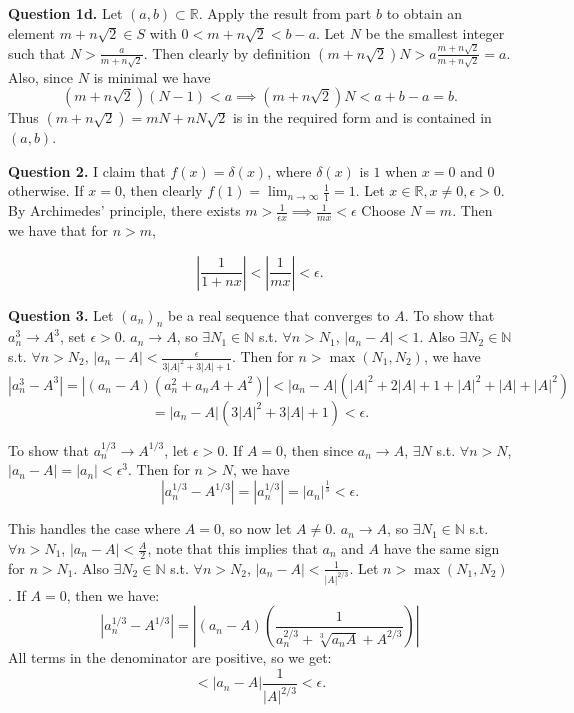 \documentclass[letterpaper, reqno,11pt]{article}
\begin{document}
{\medskip\noindent\bf Question 1d.} Let $(a,b)\subset \mathbb{R}$. Apply the result from part $b$ to obtain an element $m+n\sqrt{2}\in S$ with $0<m+n\sqrt{2}<b-a$. Let $N$ be the smallest integer such that $N>\frac{a}{m+n\sqrt{2}}$. Then clearly by definition $(m+n\sqrt{2})N>a \frac{m+n\sqrt{2}}{m+n\sqrt{2}}=a$. Also, since $N$ is minimal we have
\[
    (m+n\sqrt{2})(N-1)< a \implies (m+n\sqrt{2})N<a+b-a=b
.\]
Thus $(m+n\sqrt{2})=mN+nN\sqrt{2}$ is in the required form and is contained in $(a,b)$.

\newpage\phantom{blabla}
\newpage

{\medskip\noindent\bf Question 2.} I claim that $f(x)=\delta(x)$, where $\delta(x)$ is $1$ when $x=0$ and 0 otherwise. If $x=0$, then clearly $f(1)=\lim_{n\to\infty}\frac{1}{1}=1$. Let $x\in \mathbb{R}, x\neq 0,\epsilon>0$. By Archimedes' principle, there exists $m>\frac{1}{\epsilon x}\implies \frac{1}{mx}<\epsilon$ Choose $N=m$. Then we have that for $n>m$,

\[
\left| \frac{1}{1+nx} \right| <\left| \frac{1}{mx} \right| <\epsilon
.\]

\newpage\phantom{blabla}
\newpage

{\medskip\noindent\bf Question 3.} Let $(a_n)_n$ be a real sequence that converges to $A$. To show that $a_n^{3}\to A^3$, set $\epsilon>0$. $a_n\to A$, so $\exists N_1\in \mathbb{N}$ s.t. $\forall n>N_1$, $|a_n-A|<1$. Also $\exists N_2\in \mathbb{N}$ s.t. $\forall n>N_2$, $|a_n-A|<\frac{\epsilon}{3|A|^2+3|A|+1}$. Then for $n>\max(N_1,N_2)$, we have
\[
\left| a_n^3-A^3 \right| =\left| (a_n-A)\left( a_n^2+a_nA+A^2 \right) \right|< \left| a_n-A \right|\left( |A|^2+2|A|+1+|A|^2+|A|+|A|^2 \right) 
\]
\[
=|a_n-A|\left( 3|A|^2+3|A|+1 \right) <\epsilon
.\]

\medskip

To show that $a_n^{1/3}\to A^{1 /3}$, let $\epsilon>0$. If $A=0$, then since $a_n\to A$, $\exists N$ s.t. $\forall n>N$, $|a_n-A|=|a_n|<\epsilon^3$. Then for $n>N$, we have
\[
|a_n^{1 /3}-A^{1 /3}|=|a_n^{1 /3}|=|a_n|^{\frac{1}{3}}<\epsilon
.\]

This handles the case where $A=0$, so now let $A\neq 0$. $a_n\to A$, so $\exists N_1\in \mathbb{N}$ s.t. $\forall n>N_1$, $|a_n-A|<\frac{A}{2}$, note that this implies that $a_n$ and $A$ have the same sign for $n>N_1$. Also $\exists N_2\in \mathbb{N}$ s.t. $\forall n>N_2$, $|a_n-A|<\frac{1}{|A|^{2 /3}}$. Let $n>\max(N_1,N_2)$. If $A=0$, then we have:
\[
    \left| a_n^{1/3}-A^{1 /3} \right| =\left| (a_n-A)\left( \frac{1}{a_n^{2 /3}+\sqrt[3]{a_nA}+A^{2 /3}} \right) \right|
\]
All terms in the denominator are positive, so we get:
\[
<|a_n-A| \frac{1}{|A|^{2 /3}}< \epsilon
.\]
\end{document}
